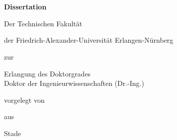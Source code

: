 \begin{titlepage}
    \begin{addmargin}[-1cm]{-3cm}
    \begin{center}
        \large

        \hfill

        \vfill

        \begingroup
            \color{CTtitle}{\huge\myTitle} \\ \bigskip \bigskip
            \color{CTtitle}{\huge\myTitleGerman} \\ \bigskip
        \endgroup
        
        \medskip
        \vfill

        \large
        \textbf{Dissertation}\\ \medskip
        
        \vspace{5ex}

			Der Technischen Fakultät

			der Friedrich-Alexander-Universität Erlangen-Nürnberg


			zur

			Erlangung des Doktorgrades\\

			Doktor der Ingenieurwissenschaften (Dr.-Ing.)


			\vspace{5ex}

			vorgelegt von

			\myName

			aus

			Stade

        \vfill

    \end{center}
  \end{addmargin}
\end{titlepage}
